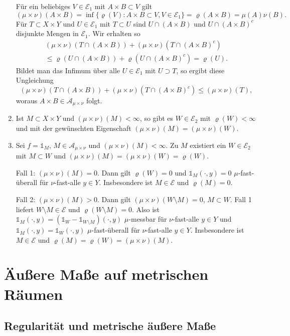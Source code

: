 \documentclass[a4paper,twoside,DIV15,BCOR12mm]{scrbook}
\newcommand{\A}{\mathcal A}
\newcommand{\ind}{\mathds 1}
\begin{document}
\begin{beweis}
\begin{enumerate}
Für ein beliebiges $V\in\mathcal E_1$ mit $A\times B\subset V$ gilt
\[
(\mu\times\nu)(A\times B) =\inf\{\varrho(V):A\times B\subset V,V\in\mathcal{E}_1\}= \varrho(A\times B) = \mu(A) \nu(B).
\]
Für $T\subset X\times Y$ und $U\in \mathcal E_1$ mit $T\subset U$ sind
$U\cap (A\times B)$ und $U\cap (A\times B)^c$ disjunkte Mengen in $\mathcal E_1$. Wir  erhalten so
\begin{multline*}
(\mu\times \nu) (T\cap (A\times B)) + (\mu\times\nu)(T\cap (A\times B)^c)
\\ \le \varrho(U\cap (A\times B)) + \varrho(U\cap (A\times B)^c) = \varrho(U).
\end{multline*}
Bildet man das Infimum über alle $U\in\mathcal E_1$ mit $U\supset T$, so ergibt diese Ungleichung
\[
(\mu\times \nu) (T\cap (A\times B)) + (\mu\times\nu)(T\cap (A\times B)^c) \le (\mu\times \nu)(T),
\]
woraus $A\times B\in\A_{\mu\times\nu}$ folgt.
\item Ist $M\subset X\times Y$ und $(\mu\times\nu)(M)<\infty$, so gibt es $W\in\mathcal E_2$ mit $\varrho(W)<\infty$ und mit der gewünschten Eigenschaft $(\mu\times\nu)(M) = (\mu\times\nu)(W)$.
\item Sei $f=\ind_M$, $M\in\A_{\mu\times\nu}$ und $(\mu\times\nu)(M)<\infty$. Zu $M$ existiert ein $W\in\mathcal E_2$ mit $M\subset W$ und $(\mu\times\nu)(M) = (\mu\times\nu)(W) =\varrho(W)$.

Fall 1: $(\mu\times\nu)(M) = 0$. Dann gilt $\varrho(W)=0$ und $\ind_M(\cdot,y)=0$ $\mu$-fast-überall für $\nu$-fast-alle $y\in Y$. Insbesondere ist $M\in\mathcal E$ und $\varrho(M)=0$.

Fall 2: $(\mu\times\nu)(M) > 0$. Dann gilt $(\mu\times\nu)(W\setminus M) = 0$, $M\subset W$. Fall 1 liefert $W\setminus M\in\mathcal E$ und $\varrho(W\setminus M)=0$. Also ist $\ind_M(\cdot, y) = (\ind_W - \ind_{W\setminus M})(\cdot,y)$ $\mu$-messbar für $\nu$-fast-alle $y\in Y$ und  $\ind_M(\cdot,y) = \ind_W(\cdot,y)$ $\mu$-fast-überall für $\nu$-fast-alle $y\in Y$. Insbesondere ist $M\in\mathcal E$ und $\varrho(M) = \varrho(W) = (\mu\times\nu)(M)$.
\end{enumerate}
\end{beweis}

\chapter{Äußere Maße auf metrischen Räumen}

\section{Regularität und metrische äußere Maße}
\end{document}
